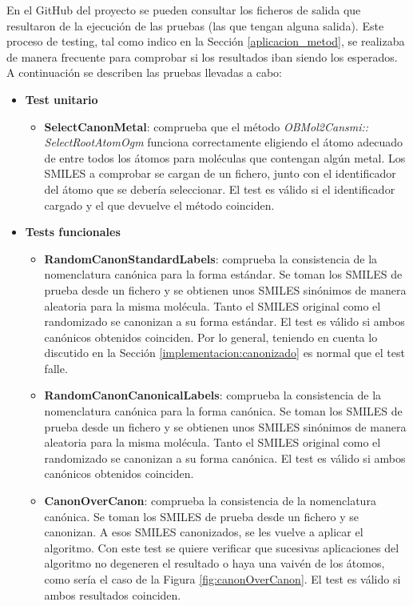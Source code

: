 En el GitHub del proyecto se pueden consultar los ficheros de salida que resultaron de la ejecución de las pruebas (las que tengan alguna salida). Este proceso de testing, tal como indico en la Sección \ref{aplicacion_metod}, se realizaba de manera frecuente para comprobar si los resultados iban siendo los esperados. A continuación se describen las pruebas llevadas a cabo:

\begin{itemize}
    \item \textbf{Test unitario}
    \begin{itemize}
        \item \textbf{SelectCanonMetal}: comprueba que el método \textit{OBMol2Cansmi:: SelectRootAtomOgm} funciona correctamente eligiendo el átomo adecuado de entre todos los átomos para moléculas que contengan algún metal. Los SMILES a comprobar se cargan de un fichero, junto con el identificador del átomo que se debería seleccionar. El test es válido si el identificador cargado y el que devuelve el método coinciden.
    \end{itemize}

    \item \textbf{Tests funcionales}
    \begin{itemize}
        \item \textbf{RandomCanonStandardLabels}: comprueba la consistencia de la nomenclatura canónica para la forma estándar. Se toman los SMILES de prueba desde un fichero y se obtienen unos SMILES sinónimos de manera aleatoria para la misma molécula. Tanto el SMILES original como el randomizado se canonizan a su forma estándar. El test es válido si ambos canónicos obtenidos coinciden. Por lo general, teniendo en cuenta lo discutido en la Sección \ref{implementacion:canonizado} es normal que el test falle.

        \item \textbf{RandomCanonCanonicalLabels}: comprueba la consistencia de la nomenclatura canónica para la forma canónica. Se toman los SMILES de prueba desde un fichero y se obtienen unos SMILES sinónimos de manera aleatoria para la misma molécula. Tanto el SMILES original como el randomizado se canonizan a su forma canónica. El test es válido si ambos canónicos obtenidos coinciden.
    
        \item \textbf{CanonOverCanon}: comprueba la consistencia de la nomenclatura canónica. Se toman los SMILES de prueba desde un fichero y se canonizan. A esos SMILES canonizados, se les vuelve a aplicar el algoritmo. Con este test se quiere verificar que sucesivas aplicaciones del algoritmo no degeneren el resultado o haya una vaivén de los átomos, como sería el caso de la Figura \ref{fig:canonOverCanon}. El test es válido si ambos resultados coinciden.


\end{itemize}
\end{itemize}
